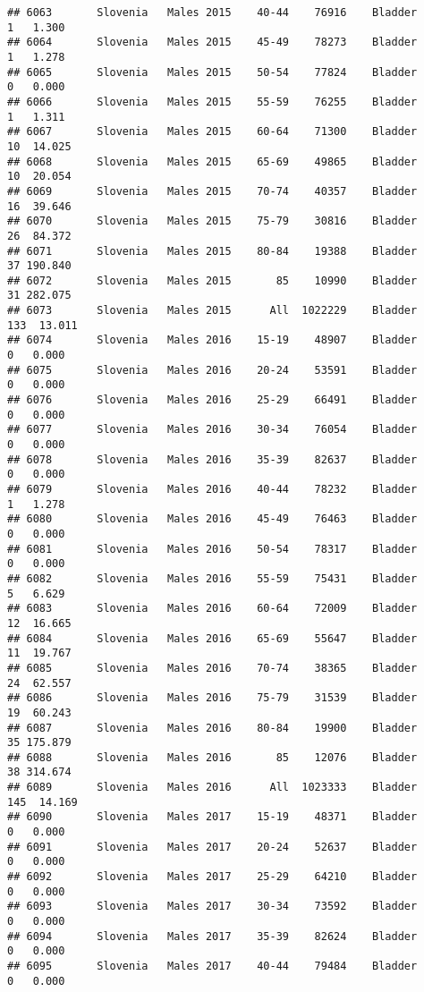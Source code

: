 \documentclass[
]{article}
\begin{document}
\begin{verbatim}
## 6063       Slovenia   Males 2015    40-44    76916    Bladder      1   1.300
## 6064       Slovenia   Males 2015    45-49    78273    Bladder      1   1.278
## 6065       Slovenia   Males 2015    50-54    77824    Bladder      0   0.000
## 6066       Slovenia   Males 2015    55-59    76255    Bladder      1   1.311
## 6067       Slovenia   Males 2015    60-64    71300    Bladder     10  14.025
## 6068       Slovenia   Males 2015    65-69    49865    Bladder     10  20.054
## 6069       Slovenia   Males 2015    70-74    40357    Bladder     16  39.646
## 6070       Slovenia   Males 2015    75-79    30816    Bladder     26  84.372
## 6071       Slovenia   Males 2015    80-84    19388    Bladder     37 190.840
## 6072       Slovenia   Males 2015       85    10990    Bladder     31 282.075
## 6073       Slovenia   Males 2015      All  1022229    Bladder    133  13.011
## 6074       Slovenia   Males 2016    15-19    48907    Bladder      0   0.000
## 6075       Slovenia   Males 2016    20-24    53591    Bladder      0   0.000
## 6076       Slovenia   Males 2016    25-29    66491    Bladder      0   0.000
## 6077       Slovenia   Males 2016    30-34    76054    Bladder      0   0.000
## 6078       Slovenia   Males 2016    35-39    82637    Bladder      0   0.000
## 6079       Slovenia   Males 2016    40-44    78232    Bladder      1   1.278
## 6080       Slovenia   Males 2016    45-49    76463    Bladder      0   0.000
## 6081       Slovenia   Males 2016    50-54    78317    Bladder      0   0.000
## 6082       Slovenia   Males 2016    55-59    75431    Bladder      5   6.629
## 6083       Slovenia   Males 2016    60-64    72009    Bladder     12  16.665
## 6084       Slovenia   Males 2016    65-69    55647    Bladder     11  19.767
## 6085       Slovenia   Males 2016    70-74    38365    Bladder     24  62.557
## 6086       Slovenia   Males 2016    75-79    31539    Bladder     19  60.243
## 6087       Slovenia   Males 2016    80-84    19900    Bladder     35 175.879
## 6088       Slovenia   Males 2016       85    12076    Bladder     38 314.674
## 6089       Slovenia   Males 2016      All  1023333    Bladder    145  14.169
## 6090       Slovenia   Males 2017    15-19    48371    Bladder      0   0.000
## 6091       Slovenia   Males 2017    20-24    52637    Bladder      0   0.000
## 6092       Slovenia   Males 2017    25-29    64210    Bladder      0   0.000
## 6093       Slovenia   Males 2017    30-34    73592    Bladder      0   0.000
## 6094       Slovenia   Males 2017    35-39    82624    Bladder      0   0.000
## 6095       Slovenia   Males 2017    40-44    79484    Bladder      0   0.000

\end{verbatim}
\end{document}
